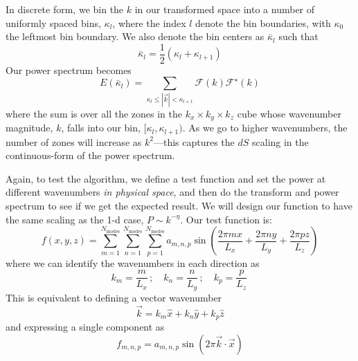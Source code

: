 \documentclass[11pt]{article}
\begin{document}
In discrete form, we bin the $k$ in our transformed space into a
number of uniformly spaced bins, $\kappa_l$, where the index
$l$ denote the bin boundaries, with $\kappa_0$ the leftmost bin boundary.
We also denote the bin centers as $\bar{\kappa}_l$ such that
\begin{equation}
\bar{\kappa}_l = \frac{1}{2} ( \kappa_l + \kappa_{l+1} )
\end{equation}
Our power spectrum becomes
\begin{equation}
E(\bar{\kappa}_l) = \sum_{\kappa_{l} \le |\vec{k}| < \kappa_{l+1}}
   \mathcal{F}(k) \mathcal{F}^\star(k)
\end{equation}
where the sum is over all the zones in the $k_x \times k_y \times k_z$
cube whose wavenumber magnitude, $k$, falls into our bin,
$[\kappa_l,\kappa_{l+1})$.  As we go to higher wavenumbers, the number
  of zones will increase as $k^2$---this captures the $dS$ scaling in
  the continuous-form of the power spectrum.


Again, to test the algorithm, we define a test function and set the power at
different wavenumbers {\em in physical space}, and then do the transform
and power spectrum to see if we get the expected result.  We will design
our function to have the same scaling as the 1-d case, $P \sim k^{-\eta}$.
Our test function
is:
\begin{equation}
f(x,y,z) = \sum_{m=1}^{N_\mathrm{modes}} 
              \sum_{n=1}^{N_\mathrm{modes}} 
              \sum_{p=1}^{N_\mathrm{modes}} 
     a_{m,n,p} \sin \left ( \frac{2\pi m x}{L_x} + 
                            \frac{2\pi n y}{L_y} + 
                            \frac{2\pi p z}{L_z} \right )
\end{equation}
where we can identify the wavenumbers in each direction as
\begin{equation}
k_m = \frac{m}{L_x} \, ; \quad 
k_n = \frac{n}{L_y} \, ; \quad 
k_p = \frac{p}{L_z} \,
\end{equation}
This is equivalent to defining a vector wavenumber
\begin{equation}
\vec{k} = k_m \hat{x} + k_n \hat{y} + k_p \hat{z}
\end{equation}
and expressing a single component as
\begin{equation}
f_{m,n,p} = a_{m,n,p} \sin(2\pi \vec{k}\cdot \vec{x})
\end{equation}
\end{document}
